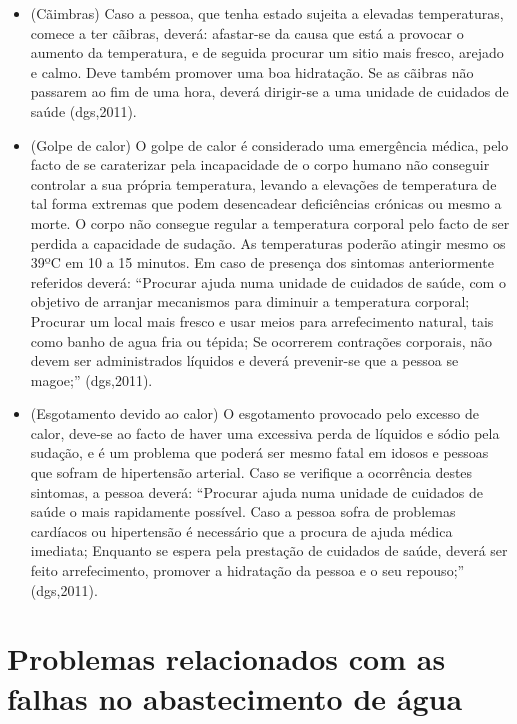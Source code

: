 \documentclass{report}
\begin{document}
\begin{itemize}
\item (Cãimbras) Caso a pessoa, que tenha estado sujeita a elevadas temperaturas, comece a ter cãibras, deverá: afastar-se da causa que está a provocar o aumento da temperatura, e de seguida procurar um sitio mais fresco, arejado e calmo. Deve também promover uma boa hidratação. Se as cãibras não passarem ao fim de uma hora, deverá dirigir-se a uma unidade de cuidados de saúde (\ac{dgs},2011).
\item (Golpe de calor) O golpe de calor é considerado uma emergência médica, pelo facto de se caraterizar pela incapacidade de o corpo humano não conseguir controlar a sua própria temperatura, levando a elevações de temperatura de tal forma extremas que podem desencadear deficiências crónicas ou mesmo a morte. O corpo não consegue regular a temperatura corporal pelo facto de ser perdida a capacidade de sudação. As temperaturas poderão atingir mesmo os 39ºC em 10 a 15 minutos.
Em caso de presença dos sintomas anteriormente referidos deverá: “Procurar ajuda numa unidade de cuidados de saúde, com o objetivo de arranjar mecanismos para diminuir a temperatura corporal; Procurar um local mais fresco e usar meios para arrefecimento natural, tais como banho de agua fria ou tépida; Se ocorrerem contrações corporais, não devem ser administrados líquidos e deverá prevenir-se que a pessoa se magoe;” (\ac{dgs},2011).
\item (Esgotamento devido ao calor) O esgotamento provocado pelo excesso de calor, deve-se ao facto de haver uma excessiva perda de líquidos e sódio pela sudação, e é um problema que poderá ser mesmo fatal em idosos e pessoas que sofram de hipertensão arterial.
Caso se verifique a ocorrência destes sintomas, a pessoa deverá: “Procurar ajuda numa unidade de cuidados de saúde o mais rapidamente possível. Caso a pessoa sofra de problemas cardíacos ou hipertensão é necessário que a procura de ajuda médica imediata; Enquanto se espera pela prestação de cuidados de saúde, deverá ser feito arrefecimento, promover a hidratação da pessoa e o seu repouso;” (\ac{dgs},2011).
\end{itemize}

\section{Problemas relacionados com as falhas no abastecimento de água}
\label{problemas relacionados com as falhas no abastecimento de água}
\cite{dgsriscos}
\end{document}
